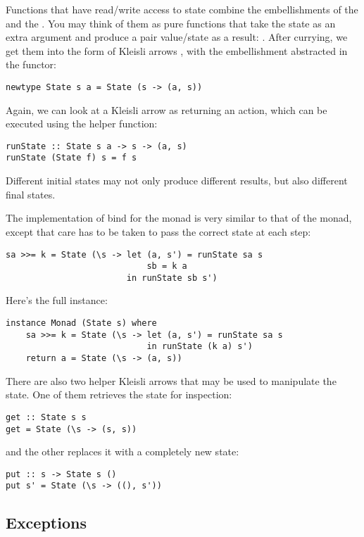Functions that have read/write access to state combine the
embellishments of the  and the . You may
think of them as pure functions that take the state as an extra argument
and produce a pair value/state as a result:
. After currying, we get them
into the form of Kleisli arrows
, with the
embellishment abstracted in the  functor:

\begin{Verbatim}
newtype State s a = State (s -> (a, s))
\end{Verbatim}
Again, we can look at a Kleisli arrow as returning an action, which can
be executed using the helper function:

\begin{Verbatim}
runState :: State s a -> s -> (a, s)
runState (State f) s = f s
\end{Verbatim}
Different initial states may not only produce different results, but
also different final states.

The implementation of bind for the  monad is very similar
to that of the  monad, except that care has to be taken
to pass the correct state at each step:

\begin{Verbatim}
sa >>= k = State (\s -> let (a, s') = runState sa s
                            sb = k a 
                        in runState sb s')
\end{Verbatim}
Here's the full instance:

\begin{Verbatim}
instance Monad (State s) where
    sa >>= k = State (\s -> let (a, s') = runState sa s
                            in runState (k a) s')
    return a = State (\s -> (a, s))
\end{Verbatim}
There are also two helper Kleisli arrows that may be used to manipulate
the state. One of them retrieves the state for inspection:

\begin{Verbatim}
get :: State s s
get = State (\s -> (s, s))
\end{Verbatim}
and the other replaces it with a completely new state:

\begin{Verbatim}
put :: s -> State s ()
put s' = State (\s -> ((), s'))
\end{Verbatim}

\subsection{Exceptions}

